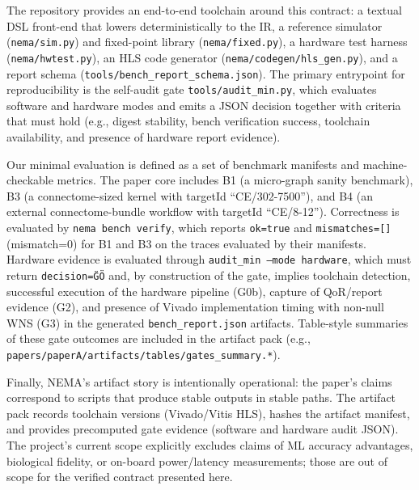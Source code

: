The repository provides an end-to-end toolchain around this contract: a textual DSL front-end that lowers deterministically to the IR, a reference simulator (\texttt{nema/sim.py}) and fixed-point library (\texttt{nema/fixed.py}), a hardware test harness (\texttt{nema/hwtest.py}), an HLS code generator (\texttt{nema/codegen/hls\_gen.py}), and a report schema (\texttt{tools/bench\_report\_schema.json}). The primary entrypoint for reproducibility is the self-audit gate \texttt{tools/audit\_min.py}, which evaluates software and hardware modes and emits a JSON decision together with criteria that must hold (e.g., digest stability, bench verification success, toolchain availability, and presence of hardware report evidence).

Our minimal evaluation is defined as a set of benchmark manifests and machine-checkable metrics. The paper core includes B1 (a micro-graph sanity benchmark), B3 (a connectome-sized kernel with targetId ``CE/302-7500''), and B4 (an external connectome-bundle workflow with targetId ``CE/8-12''). Correctness is evaluated by \texttt{nema bench verify}, which reports \texttt{ok=true} and \texttt{mismatches=[]} (mismatch=0) for B1 and B3 on the traces evaluated by their manifests. Hardware evidence is evaluated through \texttt{audit\_min --mode hardware}, which must return \texttt{decision=\"GO\"} and, by construction of the gate, implies toolchain detection, successful execution of the hardware pipeline (G0b), capture of QoR/report evidence (G2), and presence of Vivado implementation timing with non-null WNS (G3) in the generated \texttt{bench\_report.json} artifacts. Table-style summaries of these gate outcomes are included in the artifact pack (e.g., \texttt{papers/paperA/artifacts/tables/gates\_summary.*}).

Finally, NEMA's artifact story is intentionally operational: the paper's claims correspond to scripts that produce stable outputs in stable paths. The artifact pack records toolchain versions (Vivado/Vitis HLS), hashes the artifact manifest, and provides precomputed gate evidence (software and hardware audit JSON). The project's current scope explicitly excludes claims of ML accuracy advantages, biological fidelity, or on-board power/latency measurements; those are out of scope for the verified contract presented here.

